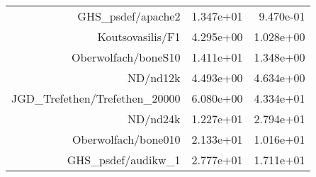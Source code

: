 \begin{tabular}{r|rr}
  GHS\_psdef/apache2                  &    1.347e+01 &    9.470e-01 \\
  Koutsovasilis/F1                    &    4.295e+00 &    1.028e+00 \\
  Oberwolfach/boneS10                 &    1.411e+01 &    1.348e+00 \\
  ND/nd12k                            &    4.493e+00 &    4.634e+00 \\
  JGD\_Trefethen/Trefethen\_20000     &    6.080e+00 &    4.334e+01 \\
  ND/nd24k                            &    1.227e+01 &    2.794e+01 \\
  Oberwolfach/bone010                 &    2.133e+01 &    1.016e+01 \\
  GHS\_psdef/audikw\_1                &    2.777e+01 &    1.711e+01 \\
  \hline
\end{tabular}
